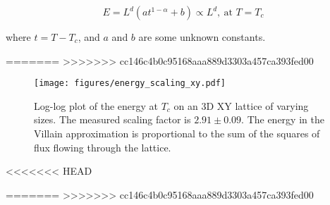 \begin{equation}
    E = L^d ( a t^{1 - \alpha} + b ) \propto L^d, \ \text{at $T = T_c$}
\end{equation}

where $t = T - T_c$, and $a$ and $b$ are some unknown constants.

=======
>>>>>>> cc146c4b0c95168aaa889d3303a457ca393fed00
\begin{figure}[h!]
    \centering
        \texttt{[image: figures/energy\_scaling\_xy.pdf]}
    \caption{Log-log plot of the energy at $T_c$ on an 3D XY lattice of varying sizes. The measured scaling factor is $2.91 \pm 0.09$. The energy in the Villain approximation is proportional to the sum of the squares of flux flowing through the lattice.}
    \label{fig:results_energyxy}
\end{figure}

<<<<<<< HEAD

=======
>>>>>>> cc146c4b0c95168aaa889d3303a457ca393fed00

